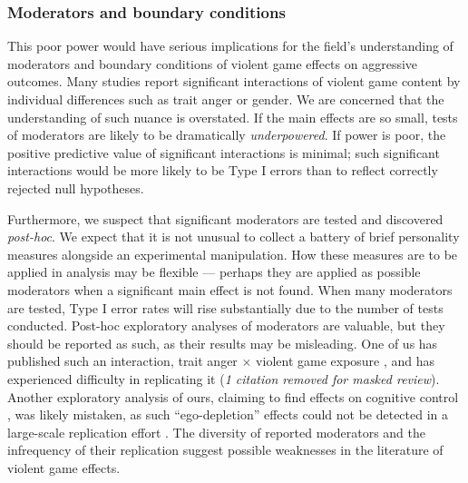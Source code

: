 \documentclass[man, mask]{apa6}
\begin{document}
\subsubsection{Moderators and boundary conditions}
This poor power would have serious implications for the field's understanding of moderators and boundary conditions of violent game effects on aggressive outcomes. Many studies report significant interactions of violent game content by individual differences such as trait anger or gender. We are concerned that the understanding of such nuance is overstated. If the main effects are so small, tests of moderators are likely to be dramatically {\em underpowered}. If power is poor, the positive predictive value of significant interactions is minimal; such significant interactions would be more likely to be Type I errors than to reflect correctly rejected null hypotheses. 

Furthermore, we suspect that significant moderators are tested and discovered {\em post-hoc}. We expect that it is not unusual to collect a battery of brief personality measures alongside an experimental manipulation. How these measures are to be applied in analysis may be flexible --- perhaps they are applied as possible moderators when a significant main effect is not found. When many moderators are tested, Type I error rates will rise substantially due to the number of tests conducted. Post-hoc exploratory analyses of moderators are valuable, but they should be reported as such, as their results may be misleading. %
One of us has published such an interaction, trait anger $\times$ violent game exposure , and has experienced difficulty in replicating it ({\em 1 citation removed for masked review}). Another exploratory analysis of ours, claiming to find effects on cognitive control , was likely mistaken, as such ``ego-depletion'' effects could not be detected in a large-scale replication effort \citep{Hagger:etal:inpress}. The diversity of reported moderators and the infrequency of their replication suggest possible weaknesses in the literature of violent game effects. 
\end{document}
